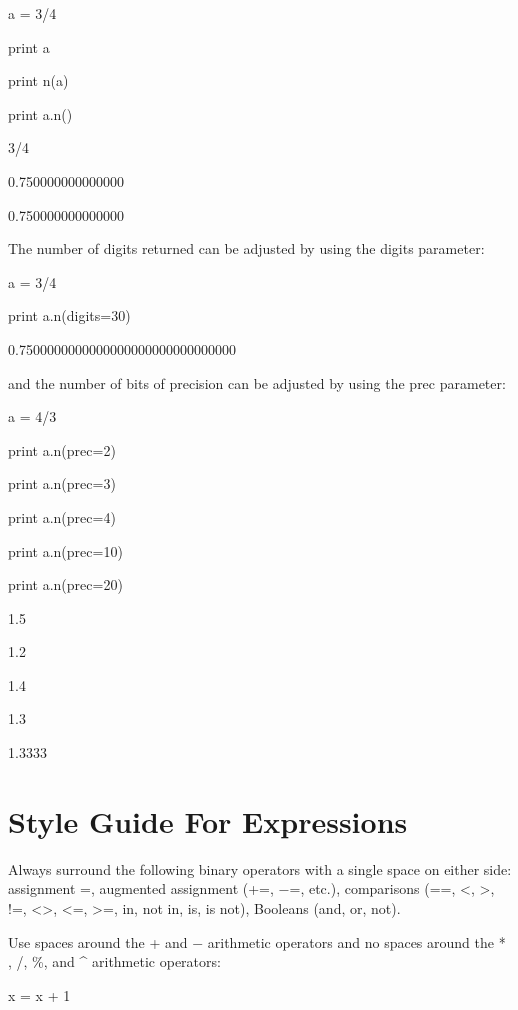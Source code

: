 \documentclass[12pt,twoside]{book}
\begin{document}
\bigskip

a = 3/4

print a

print n(a)

print a.n()

{\textbar}

3/4

0.750000000000000

0.750000000000000

The number of digits returned can be adjusted by using the digits parameter: 

\bigskip

a = 3/4

print a.n(digits=30)

{\textbar}

0.7500000000000000000000000000000


\bigskip

and the number of bits of precision can be adjusted by using the prec parameter:


\bigskip

a = 4/3

print a.n(prec=2)

print a.n(prec=3)

print a.n(prec=4)

print a.n(prec=10)

print a.n(prec=20)

{\textbar}

1.5

1.2

1.4

1.3

1.3333

\section[Style Guide For Expressions]{Style Guide For Expressions}

Always surround the following binary operators with a single space on either side: assignment {\textquotesingle}={\textquotesingle}, augmented assignment (+=, $-$=, etc.), comparisons (==, {\textless}, {\textgreater}, !=, {\textless}{\textgreater}, {\textless}=, {\textgreater}=, in, not in, is, is not), Booleans (and, or, not). 

\bigskip

Use spaces around the + and $-$ arithmetic operators and no spaces around the * , /, \%, and \^{} arithmetic operators:

x = x + 1
\end{document}
